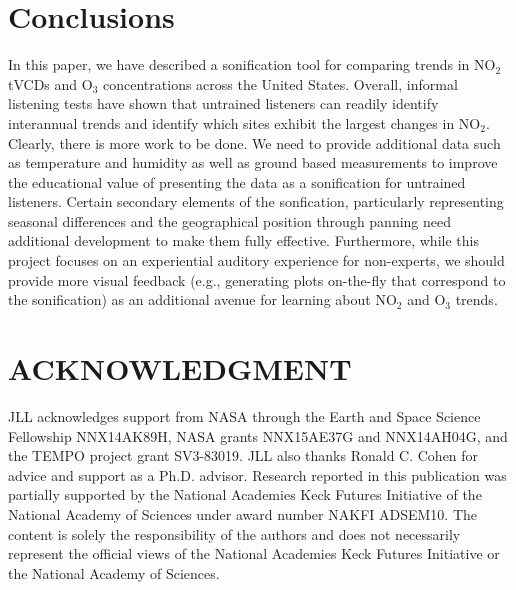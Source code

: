 \documentclass[a4paper,10pt,oneside]{article}
\newcommand{\ce}[1]{$\mathrm{#1}$}
\begin{document}
\begin{sloppy}
\section{Conclusions}
In this paper, we have described a sonification tool for comparing trends in \ce{NO_2} tVCDs and \ce{O_3} concentrations across the United States.  Overall, informal listening tests have shown that untrained listeners can readily identify interannual trends and identify which sites exhibit the largest changes in \ce{NO_2}.  Clearly, there is more work to be done. We need to provide additional data such as temperature and humidity as well as ground based measurements to improve the educational value of presenting the data as a sonification for untrained listeners.  Certain secondary elements of the sonfication, particularly representing seasonal differences and the geographical position through panning need additional development to make them fully effective.  Furthermore, while this project focuses on an experiential auditory experience for non-experts, we should provide more visual feedback (e.g., generating plots on-the-fly that correspond to the sonification) as an additional avenue for learning about \ce{NO_2} and \ce{O_3} trends.  


\section{ACKNOWLEDGMENT}
\label{sec:ack}

JLL acknowledges support from NASA through the Earth and Space Science Fellowship NNX14AK89H, NASA grants NNX15AE37G and NNX14AH04G, and the TEMPO project grant SV3-83019.  JLL also thanks Ronald C. Cohen for advice and support as a Ph.D. advisor. Research reported in this publication was partially supported by the National Academies Keck Futures Initiative of the National Academy of Sciences under award number NAKFI ADSEM10. The content is solely the responsibility of the authors and does not necessarily represent the official views of the National Academies Keck Futures Initiative or the National Academy of Sciences.



\footnotesize{

}

\AtEndDocument{\par\leavevmode}
\end{sloppy}
\end{document}
